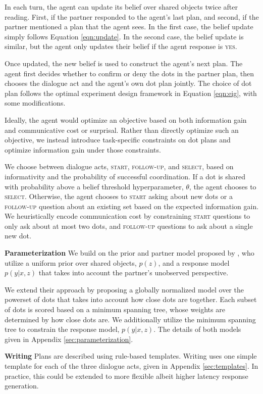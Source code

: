 \documentclass[11pt]{article}
\begin{document}
In each turn, the agent can update its belief over shared objects twice after reading.
First, if the partner responded to the agent's last plan,
and second, if the partner mentioned a plan that the agent sees.
In the first case, the belief update simply follows Equation \ref{eqn:update}.
In the second case, the belief update is similar, but the agent only updates their belief if the agent response is \textsc{yes}.

Once updated, the new belief is used to construct the agent's next plan.
The agent first decides whether to confirm or deny the dots in the partner plan,
then chooses the dialogue act and the agent's own dot plan jointly.
The choice of dot plan follows the optimal experiment design framework 
in Equation \ref{eqn:eig}, with some modifications.

Ideally, the agent would optimize an objective based on both information gain and communicative cost or surprisal.
Rather than directly optimize such an objective,
we instead introduce task-specific constraints on dot plans and optimize information gain under those constraints.


We choose between dialogue acts, \textsc{start}, \textsc{follow-up}, and \textsc{select}, based on informativity and the probability of successful coordination. If a dot is shared with probability above a belief threshold hyperparameter, $\theta$, the agent chooses to \textsc{select}.
Otherwise, the agent chooses to \textsc{start} asking about 
new dots or a \textsc{follow-up} question
about an existing set based on the expected information gain.
We heuristically encode communication cost by constraining \textsc{start} questions to only ask about at most two dots, and \textsc{follow-up} questions
to ask about a single new dot.

\textbf{Parameterization}
We build on the prior and partner model proposed by \citet{ocp},
who utilize a uniform prior over shared objects, $p(z)$,
and a response model $p(y|x,z)$ that takes into account the partner's
unobserved perspective.

We extend their approach by proposing a globally normalized model over the powerset of dots
that takes into account how close dots are together.
Each subset of dots is scored based on a minimum spanning tree,
whose weights are determined by how close dots are.
We additionally utilize the minimum spanning tree to constrain the response model, $p(y|x,z)$.
The details of both models given in Appendix \ref{sec:parameterization}.

\textbf{Writing}
Plans are described using rule-based templates.
Writing uses one simple template for each of the three dialogue acts,
given in Appendix \ref{sec:templates}.
In practice, this could be extended to more flexible albeit higher latency response generation.
\end{document}
